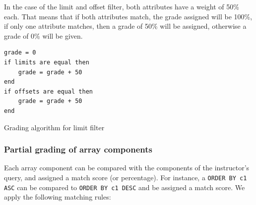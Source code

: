 In the case of the limit and offset filter, both attributes have a weight of 50\% each. That means that if both attributes match, the grade assigned will be 100\%, if only one attribute matches, then a grade of 50\% will be assigned, otherwise a grade of 0\% will be given.
\begin{code}
\begin{verbatim}
grade = 0
if limits are equal then
    grade = grade + 50
end
if offsets are equal then
    grade = grade + 50
end
\end{verbatim}
\caption{Grading algorithm for limit filter}
\end{code}
\subsubsection{Partial grading of array components}

Each array component can be compared with the components of the instructor's query, and assigned a match score (or percentage). For instance, a \texttt{ORDER BY c1 ASC} can be compared to \texttt{ORDER BY c1 DESC} and be assigned a match score. We apply the following matching rules:


